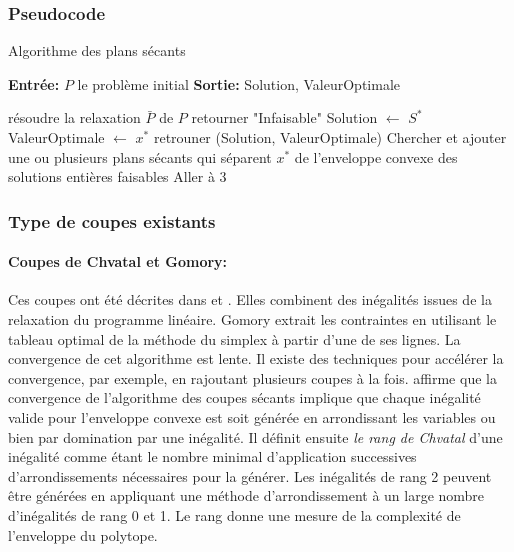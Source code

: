 \documentclass[12pt,a4paper,oneside]{book}
\theoremstyle{definition}
\begin{document}
		\subsubsection{Pseudocode}
	    \begin{algorithm}[H]
		    \caption{Algorithme des plans sécants}
    		\SetAlgoLined
    		\DontPrintSemicolon
    		\textbf{Entrée:} $P$ le problème initial \;
    		\textbf{Sortie:} Solution, ValeurOptimale \;
    		
    		résoudre la relaxation $\bar{P}$ de $P$ \;
    		{
    		    retourner "Infaisable" \;
    		}
    		{
    		    Solution $\gets$ $S^*$ \;
    		    ValeurOptimale $\gets$ $x^*$ \;
    		    retrouner (Solution, ValeurOptimale) \;
    		}
    		{
    		    Chercher et ajouter une ou plusieurs plans sécants qui séparent $x^*$ de l'enveloppe convexe des solutions entières faisables \;
    		    Aller à 3 \;
    		}
	    \end{algorithm}
		\subsubsection{Type de coupes existants}
		\paragraph{Coupes de Chvatal et Gomory:}
		Ces coupes ont été décrites dans \cite{gomory1958} et \cite{CHVATAL1973305}. Elles combinent des inégalités issues de la relaxation du programme linéaire. Gomory extrait les contraintes en utilisant le tableau optimal de la méthode du simplex à partir d'une de ses lignes. La convergence de cet algorithme est lente. Il existe des techniques pour accélérer la convergence, par exemple, en rajoutant plusieurs coupes à la fois. \cite{mitchell2009integer} affirme que la convergence de l'algorithme des coupes sécants implique que chaque inégalité valide pour l'enveloppe convexe est soit générée en arrondissant les variables ou bien par domination par une inégalité. Il définit ensuite \textit{le rang de Chvatal} d'une inégalité comme étant le nombre minimal d'application successives d'arrondissements nécessaires pour la générer. Les inégalités de rang 2 peuvent être générées en appliquant une méthode d'arrondissement à un large nombre d'inégalités de rang 0 et 1. Le rang donne une mesure de la complexité de l'enveloppe du polytope. 
		
\end{document}
